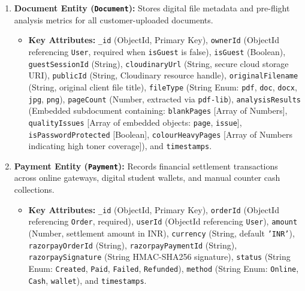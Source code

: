 \documentclass[12pt,a4paper]{report}
\begin{document}
\begin{enumerate}[leftmargin=0.35in, itemsep=4pt]
  \item \textbf{Document Entity (\texttt{Document}):}
  Stores digital file metadata and pre-flight analysis metrics for all customer-uploaded documents.
  \begin{itemize}[leftmargin=0.25in, itemsep=2pt]
    \item \textbf{Key Attributes:} \texttt{\_id} (ObjectId, Primary Key), \texttt{ownerId} (ObjectId referencing \texttt{User}, required when \texttt{isGuest} is false), \texttt{isGuest} (Boolean), \texttt{guestSessionId} (String), \texttt{cloudinaryUrl} (String, secure cloud storage URI), \texttt{publicId} (String, Cloudinary resource handle), \texttt{originalFilename} (String, original client file title), \texttt{fileType} (String Enum: \texttt{pdf}, \texttt{doc}, \texttt{docx}, \texttt{jpg}, \texttt{png}), \texttt{pageCount} (Number, extracted via \texttt{pdf-lib}), \texttt{analysisResults} (Embedded subdocument containing: \texttt{blankPages} [Array of Numbers], \texttt{qualityIssues} [Array of embedded objects: \texttt{page}, \texttt{issue}], \texttt{isPasswordProtected} [Boolean], \texttt{colourHeavyPages} [Array of Numbers indicating high toner coverage]), and \texttt{timestamps}.
  \end{itemize}

  \item \textbf{Payment Entity (\texttt{Payment}):}
  Records financial settlement transactions across online gateways, digital student wallets, and manual counter cash collections.
  \begin{itemize}[leftmargin=0.25in, itemsep=2pt]
    \item \textbf{Key Attributes:} \texttt{\_id} (ObjectId, Primary Key), \texttt{orderId} (ObjectId referencing \texttt{Order}, required), \texttt{userId} (ObjectId referencing \texttt{User}), \texttt{amount} (Number, settlement amount in INR), \texttt{currency} (String, default \texttt{'INR'}), \texttt{razorpayOrderId} (String), \texttt{razorpayPaymentId} (String), \texttt{razorpaySignature} (String HMAC-SHA256 signature), \texttt{status} (String Enum: \texttt{Created}, \texttt{Paid}, \texttt{Failed}, \texttt{Refunded}), \texttt{method} (String Enum: \texttt{Online}, \texttt{Cash}, \texttt{wallet}), and \texttt{timestamps}.
  \end{itemize}


\end{enumerate}
\end{document}

